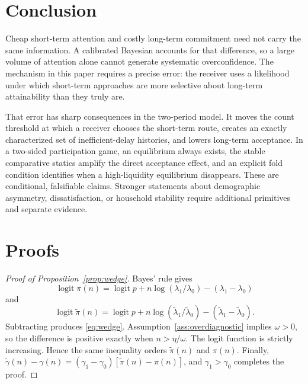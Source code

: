 \documentclass[11pt]{article}
\newcommand{\logit}{\operatorname{logit}}
\begin{document}
\section{Conclusion}

Cheap short-term attention and costly long-term commitment need not carry the
same information. A calibrated Bayesian accounts for that difference, so a
large volume of attention alone cannot generate systematic overconfidence. The
mechanism in this paper requires a precise error: the receiver uses a likelihood
under which short-term approaches are more selective about long-term
attainability than they truly are.

That error has sharp consequences in the two-period model. It moves the count
threshold at which a receiver chooses the short-term route, creates an exactly
characterized set of inefficient-delay histories, and lowers long-term
acceptance. In a two-sided participation game, an equilibrium always exists,
the stable comparative statics amplify the direct acceptance effect, and an
explicit fold condition identifies when a high-liquidity equilibrium
disappears. These are conditional, falsifiable claims. Stronger statements
about demographic asymmetry, dissatisfaction, or household stability require
additional primitives and separate evidence.

\appendix

\section{Proofs}

\begin{proof}[Proof of Proposition~\ref{prop:wedge}]
Bayes' rule gives
\[
\logit\pi(n)
=\logit p+n\log(\lambda_1/\lambda_0)-(\lambda_1-\lambda_0)
\]
and
\[
\logit\widetilde\pi(n)
=\logit p+n\log(\widetilde\lambda_1/\widetilde\lambda_0)
-(\widetilde\lambda_1-\widetilde\lambda_0).
\]
Subtracting produces \eqref{eq:wedge}. Assumption~\ref{ass:overdiagnostic}
implies $\omega>0$, so the difference is positive exactly when
$n>\eta/\omega$. The logit function is strictly increasing. Hence the same
inequality orders $\widetilde\pi(n)$ and $\pi(n)$. Finally,
$\widetilde\gamma(n)-\gamma(n)
=(\gamma_1-\gamma_0)[\widetilde\pi(n)-\pi(n)]$, and
$\gamma_1>\gamma_0$ completes the proof.
\end{proof}
\end{document}
